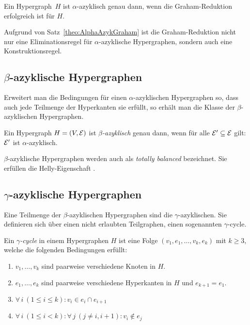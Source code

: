 \begin{Theorem}\label{theo:AlphaAzykGraham} \cite{Beeri1983}
    Ein Hypergraph~$H$ ist $\alpha$-azyklisch genau dann, wenn die Graham-Reduktion erfolgreich ist für $H$.
\end{Theorem}

Aufgrund von Satz~\ref{theo:AlphaAzykGraham} ist die Graham-Reduktion nicht nur eine Eliminationsregel für $\alpha$-azyklische Hypergraphen, sondern auch eine Konstruktionsregel.

\subsection{$\beta$-azyklische Hypergraphen}
Erweitert man die Bedingungen für einen $\alpha$-azyklischen Hypergraphen so, dass auch jede Teilmenge der Hyperkanten sie erfüllt, so erhält man die Klasse der $\beta$-azyklischen Hypergraphen.

\begin{mydef}
    Ein Hypergraph $H=(V,\mathcal{E})$ ist \emph{$\beta$-azyklisch} genau dann, wenn für alle $\mathcal{E}' \subseteq \mathcal{E}$ gilt: $\mathcal{E}'$ ist $\alpha$-azyklisch.
\end{mydef}

$\beta$-azyklische Hypergraphen werden auch als \emph{totally balanced} bezeichnet. Sie erfüllen die Helly-Eigenschaft \cite{berge1989hypergraphs}.
      
\subsection{$\gamma$-azyklische Hypergraphen}
Eine Teilmenge der $\beta$-azyklischen Hypergraphen sind die $\gamma$-azyklischen. Sie definieren sich über einen nicht erlaubten Teilgraphen, einen sogenannten $\gamma$-cycle.

\begin{mydef}\label{def:GammyCycle}
    Ein \emph{$\gamma$-cycle} in einem Hypergraphen $H$ ist eine Folge $(v_1,e_1,\ldots,v_k,e_k)$ mit $k \geq 3$, welche die folgenden Bedingungen erfüllt:
    \begin{enumerate}
        \item $v_1,\ldots, v_k$ sind paarweise verschiedene Knoten in $H$.
        \item $e_1,\ldots, e_k$ sind paarweise verschiedene Hyperkanten in $H$ und $e_{k+1}=e_1$.
        \item $\forall\, i\ (1 \leq i \leq k): v_i \in e_i \cap e_{i+1}$
        \item\label{BedingungDefGammaCycle} $\forall\, i\ (1 \leq i < k): \forall\, j\ (j \neq i,i+1): v_i \notin e_j$
    \end{enumerate}
\end{mydef}

